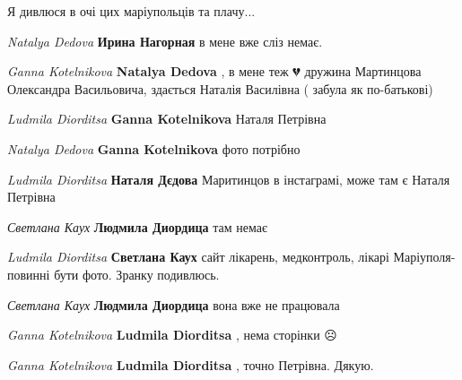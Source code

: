  
 
 
 
 

\qqSecCmt

\begin{itemize} %

Я дивлюся в очі цих маріупольців та плачу...

\begin{itemize} %
\emph{Natalya Dedova}
\textbf{Ирина Нагорная} в мене вже сліз немає.

\emph{Ganna Kotelnikova}
\textbf{Natalya Dedova} , в мене теж 💔 дружина Мартинцова Олександра Васильовича, здається Наталія Василівна ( забула як по-батькові)

\emph{Ludmila Diorditsa}
\textbf{Ganna Kotelnikova} Наталя Петрівна

\emph{Natalya Dedova}
\textbf{Ganna Kotelnikova} фото потрібно

\emph{Ludmila Diorditsa}
\textbf{Наталя Дєдова} Маритинцов в інстаграмі, може там є Наталя Петрівна

\emph{Светлана Каух}
\textbf{Людмила Диордица} там немає

\emph{Ludmila Diorditsa}
\textbf{Светлана Каух} сайт лікарень, медконтроль, лікарі Маріуполя- повинні бути фото. Зранку подивлюсь.

\emph{Светлана Каух}
\textbf{Людмила Диордица} вона вже не працювала

\emph{Ganna Kotelnikova}
\textbf{Ludmila Diorditsa} , нема сторінки ☹️

\emph{Ganna Kotelnikova}
\textbf{Ludmila Diorditsa} , точно Петрівна. Дякую.
\end{itemize} %

\end{itemize} %
